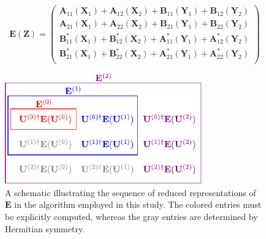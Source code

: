 \begin{equation}
    \mathbf{E}(\mathbf{Z})
    =
    \begin{pmatrix}
        \mathbf{A}_{11}(\mathbf{X}_1) +
        \mathbf{A}_{12}(\mathbf{X}_2) +
        \mathbf{B}_{11}(\mathbf{Y}_1) +
        \mathbf{B}_{12}(\mathbf{Y}_2) \\
        \mathbf{A}_{21}(\mathbf{X}_1) +
        \mathbf{A}_{22}(\mathbf{X}_2) +
        \mathbf{B}_{21}(\mathbf{Y}_1) +
        \mathbf{B}_{22}(\mathbf{Y}_2) \\
        \mathbf{B}^*_{11}(\mathbf{X}_1) +
        \mathbf{B}^*_{12}(\mathbf{X}_2) +
        \mathbf{A}^*_{11}(\mathbf{Y}_1) +
        \mathbf{A}^*_{12}(\mathbf{Y}_2) \\
        \mathbf{B}^*_{21}(\mathbf{X}_1) +
        \mathbf{B}^*_{22}(\mathbf{X}_2) +
        \mathbf{A}^*_{21}(\mathbf{Y}_1) +
        \mathbf{A}^*_{22}(\mathbf{Y}_2) \\
    \end{pmatrix}
\end{equation}


\begin{figure}[h!]
    \centering
    \caption{%
        \label{fig:davidson}
        A schematic illustrating the sequence of reduced representations of
        \(\mathbf{E}\) in the algorithm employed in this study.
        The colored entries must be explicitly computed, whereas the gray
        entries are determined by Hermitian symmetry.
    }
    \includegraphics[width=8.5cm]{figures/davidson.pdf}
\end{figure}

